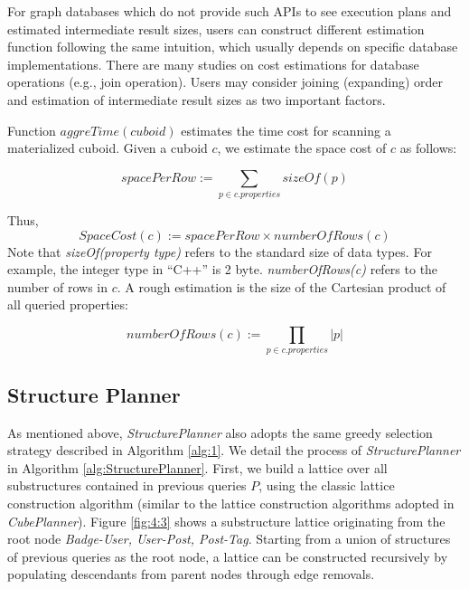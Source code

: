 For graph databases which do not provide such APIs to see execution plans and estimated intermediate result sizes, users can construct different estimation function following the same intuition, which usually depends on specific database implementations. There are many studies on cost estimations for database operations (e.g., join operation). Users may consider joining (expanding) order \cite{DBLP:conf/pods/Chaudhuri98} and estimation of intermediate result sizes  \cite{DBLP:conf/edbt/SwamiS94} as two important factors.

Function \textbf{$aggreTime(cuboid)$} estimates the time cost for scanning a materialized cuboid. Given a cuboid $c$, we estimate the space cost of $c$ as follows:


\begin{displaymath}
spacePerRow:=
\displaystyle{\sum_{p\in c.properties}sizeOf(p)}
\end{displaymath}

\noindent Thus,
\begin{displaymath}
SpaceCost(c):= spacePerRow \times numberOfRows(c)
\end{displaymath}
Note that \textit{sizeOf(property type)} refers to the standard size of data types. For example, the integer type in ``C++'' is 2 byte. \textit{numberOfRows(c)} refers to the number of rows in $c$. A rough estimation is the size of the Cartesian product of all queried properties:

\begin{displaymath}
numberOfRows(c):= \displaystyle{\prod_{p\in c.properties}|p|}
\end{displaymath}


\subsection{Structure Planner}
\label{Structure Planner}
As mentioned above, \emph{StructurePlanner} also adopts the same greedy selection strategy described in Algorithm \ref{alg:1}. We detail the process of \emph{StructurePlanner} in Algorithm \ref{alg:StructurePlanner}. First, we build a lattice over all substructures contained in previous queries $P$, using the classic lattice construction algorithm (similar to the lattice construction algorithms adopted in \emph{CubePlanner}). Figure \ref{fig:4:3} shows a substructure lattice originating from the root node \textit{Badge-User, User-Post, Post-Tag}. Starting from a union of structures of previous queries as the root node, a lattice can be constructed recursively by populating descendants from parent nodes through edge removals.

